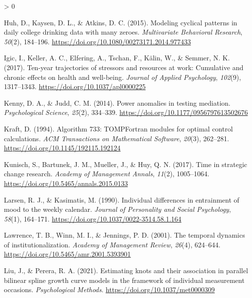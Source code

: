 \documentclass[
12pt, %
twoside,
english]{guelphthesis}
\newlength{\cslhangindent}
\newenvironment{CSLReferences}[2] %
 {%
  \setlength{\parindent}{0pt}
  \ifodd #1 \everypar{\setlength{\hangindent}{\cslhangindent}}\ignorespaces\fi
  \ifnum #2 > 0
  \setlength{\parskip}{\linespacing{2}}
  \fi
 }%
 {}
\theoremstyle{definition}
\theoremstyle{definition}
\theoremstyle{definition}
\theoremstyle{definition}
\theoremstyle{remark}
\begin{document}
\begin{CSLReferences}{1}{0}
\leavevmode{}%
Huh, D., Kaysen, D. L., \& Atkins, D. C. (2015). Modeling cyclical patterns in daily college drinking data with many zeroes. \emph{Multivariate Behavioral Research}, \emph{50}(2), 184--196. \url{https://doi.org/10.1080/00273171.2014.977433}

\leavevmode{}%
Igic, I., Keller, A. C., Elfering, A., Tschan, F., Kälin, W., \& Semmer, N. K. (2017). Ten-year trajectories of stressors and resources at work: Cumulative and chronic effects on health and well-being. \emph{Journal of Applied Psychology}, \emph{102}(9), 1317--1343. \url{https://doi.org/10.1037/apl0000225}

\leavevmode{}%
Kenny, D. A., \& Judd, C. M. (2014). Power anomalies in testing mediation. \emph{Psychological Science}, \emph{25}(2), 334--339. \url{https://doi.org/10.1177/0956797613502676}

\leavevmode{}%
Kraft, D. (1994). Algorithm 733: TOMP{\textendash}Fortran modules for optimal control calculations. \emph{ACM Transactions on Mathematical Software}, \emph{20}(3), 262--281. \url{https://doi.org/10.1145/192115.192124}

\leavevmode{}%
Kunisch, S., Bartunek, J. M., Mueller, J., \& Huy, Q. N. (2017). Time in strategic change research. \emph{Academy of Management Annals}, \emph{11}(2), 1005--1064. \url{https://doi.org/10.5465/annals.2015.0133}

\leavevmode{}%
Larsen, R. J., \& Kasimatis, M. (1990). Individual differences in entrainment of mood to the weekly calendar. \emph{Journal of Personality and Social Psychology}, \emph{58}(1), 164--171. \url{https://doi.org/10.1037/0022-3514.58.1.164}

\leavevmode{}%
Lawrence, T. B., Winn, M. I., \& Jennings, P. D. (2001). The temporal dynamics of institutionalization. \emph{Academy of Management Review}, \emph{26}(4), 624--644. \url{https://doi.org/10.5465/amr.2001.5393901}

\leavevmode{}%
Liu, J., \& Perera, R. A. (2021). Estimating knots and their association in parallel bilinear spline growth curve models in the framework of individual measurement occasions. \emph{Psychological Methods}. \url{https://doi.org/10.1037/met0000309}


\end{CSLReferences}
\end{document}
